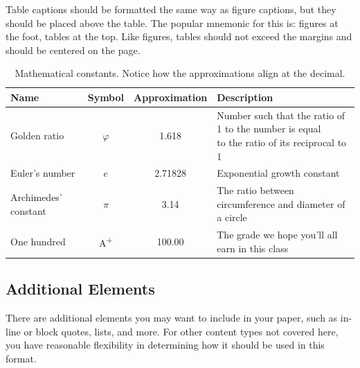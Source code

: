 \documentclass[11pt,a4paper,usenames,dvipsnames]{article}
\begin{document}
Table captions should be formatted the same way as figure captions, but they should be placed above the table. The popular mnemonic for this is: figures at the foot, tables at the top. Like figures, tables should not exceed the margins and should be centered on the page.
\begin{table}[ht]
\caption{\label{tab:math} Mathematical constants. Notice how the approximations align at the decimal.}
\centering
\begin{adjustbox}{width=1\textwidth}
\small
\begin{tabular}{l c c l}
Name & Symbol & Approximation & Description \\
\hline
Golden ratio & $\varphi$ & 1.618 & \shortstack[l]{Number such that the ratio of 1 to the number is equal \\ to the ratio of its reciprocal to 1} \\

Euler’s number & $e$ & 2.71828 & Exponential growth constant \\

Archimedes’ constant & $\pi$ & 3.14 & The ratio between circumference and diameter of a circle \\


One hundred & A\textsuperscript{+} & 100.00 & The grade we hope you’ll all earn in this class \\

\end{tabular}
\end{adjustbox}
\end{table}

\subsection{Additional Elements}
There are additional elements you may want to include in your paper, such as in-line or block quotes, lists, and more. For other content types not covered here, you have reasonable flexibility in determining how it should be used in this format.
\end{document}

